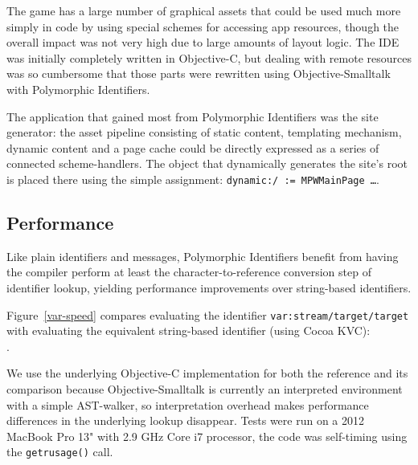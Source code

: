 \documentclass[preprint]{sigplanconf}
\begin{document}
The game has a large number of graphical assets that could be used much more simply in code by using special schemes for accessing app
resources, though the overall impact was not very high due to large amounts of layout logic. 
 The IDE was initially completely written in Objective-C, but dealing with remote resources was so cumbersome that
those parts were rewritten using Objective-Smalltalk with Polymorphic Identifiers.

The application that gained most from Polymorphic Identifiers was the site generator:  the asset pipeline consisting of static
content, templating mechanism, dynamic content and a page cache could be directly expressed as a series of connected
scheme-handlers.  The object that dynamically generates the site's root is placed there using the simple assignment: {\tt dynamic:/  := MPWMainPage \dots}.


\subsection{Performance}

Like plain identifiers and messages, Polymorphic Identifiers benefit from having the compiler perform
at least the character-to-reference conversion step of identifier lookup, yielding performance 
improvements over string-based identifiers.

\sloppy
Figure~\ref{var-speed} compares evaluating the identifier {\tt var:stream/target/target} with evaluating the  
equivalent string-based identifier (using Cocoa KVC): \\  { . }
\fussy

We use the underlying Objective-C implementation for both the reference and its 
comparison because Objective-Smalltalk is currently an interpreted environment with
a simple AST-walker, so interpretation overhead makes performance differences in
the underlying lookup disappear.  Tests were run on a 2012 MacBook Pro 13" with 2.9 GHz Core i7 processor, the
code was self-timing using the {\tt getrusage()} call.  
\end{document}
